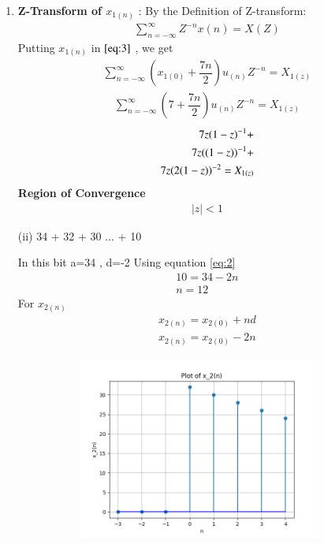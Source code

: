 \documentclass[journal,12pt,twocolumn]{IEEEtran}
\theoremstyle{remark}
\begin{document}
\begin{enumerate}
\vspace{0.05cm}
\item 
\textbf{Z-Transform of $x_{1(n)}$} :
\vspace{0.2cm}
By the Definition of Z-transform:
\begin{align}
 \sum_{n=-\infty}^{\infty} Z^{-n}x(n) = X(Z)\label{eq:3}
 \end{align}
\vspace{0.05cm}Putting $x_{1(n)}$ in $\eqref{eq:3}$ , we get \vspace{0.05cm}
\begin{align}
     \sum_{n=-\infty}^{\infty}(x_{1(0)} + \dfrac{7n}{2})u_{(n)}Z^{-n} =X_{1(z)}
\end{align}
\begin{align}
\sum_{n=-\infty}^{\infty}(7 + \dfrac{7n}{2})u_{(n)}Z^{-n} =X_{1(z)}
\end{align}
\begin{align}
\notag7z(1-z)^{-1}+\\
\notag 7z((1-z))^{-1}+\\
7z(2(1-z))^{-2}=X_{1(z)}
\end{align}
\vspace{0.05cm}
\vspace{0.05cm}
\textbf{Region of Convergence}
\vspace{0.05cm}
\begin{align}
    \lvert z\rvert  <  1 
    \end{align}

\vspace{0.5cm}
\item[(ii)]
 34 + 32 + 30 ... + 10\vspace{0.05cm}
\vspace{0.2cm}

In this bit \vspace{0.05cm} a=34 , d=-2
Using equation \eqref{eq:2}
\begin{align}
     10 = 34 -2n\\
     n=12 
     \end{align}
For $x_{2(n)}$
\begin{align}
x_{2(n)} = x_{2(0)} + nd\\
x_{2(n)} = x_{2(0)} -2n
\end{align}

\begin{figure}[!ht]
\centering
  \graphicspath{ {figs/} }
\includegraphics[width=10cm, height=6cm]{graph_2}
\label{graph:3}
\end{figure}


\end{enumerate}
\end{document}

